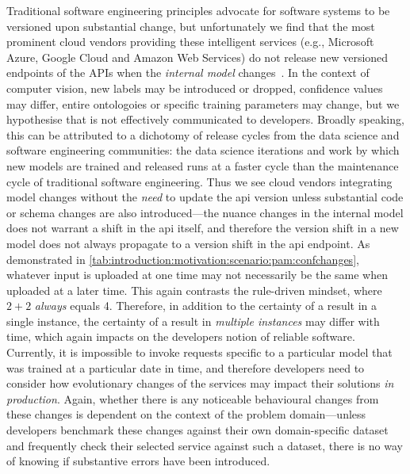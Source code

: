 Traditional software engineering principles advocate for software systems to be versioned upon substantial change, but unfortunately we find that the most prominent cloud vendors providing these intelligent services (e.g., Microsoft Azure, Google Cloud and Amazon Web Services) do not release new versioned endpoints of the APIs when the \textit{internal model} changes~\citep{Cummaudo:2019icsme}. In the context of computer vision, new labels may be introduced or dropped, confidence values may differ, entire ontologoies or specific training parameters may change, but we hypothesise that is not effectively communicated to developers. Broadly speaking, this can be attributed to a dichotomy of release cycles from the data science and software engineering communities: the data science iterations and work by which new models are trained and released runs at a faster cycle than the maintenance cycle of traditional software engineering. Thus we see cloud vendors integrating model changes without the \textit{need} to update the \gls{api} version unless substantial code or schema changes are also introduced---the nuance changes in the internal model does not warrant a shift in the \gls{api} itself, and therefore the version shift in a new model does not always propagate to a version shift in the \gls{api} endpoint.
As demonstrated in \cref{tab:introduction:motivation:scenario:pam:confchanges}, whatever input is uploaded at one time may not necessarily be the same when uploaded at a later time. This again contrasts the rule-driven mindset, where $2+2$ \textit{always} equals 4. Therefore, in addition to the certainty of a result in a single instance, the certainty of a result in \textit{multiple instances} may differ with time, which again impacts on the developers notion of reliable software.
Currently, it is impossible to invoke requests specific to a particular model that was trained at a particular date in time, and therefore developers need to consider how evolutionary changes of the services may impact their solutions \textit{in production}. Again, whether there is any noticeable behavioural changes from these changes is dependent on the context of the problem domain---unless developers benchmark these changes against their own domain-specific dataset and frequently check their selected service against such a dataset, there is no way of knowing if substantive errors have been introduced.

